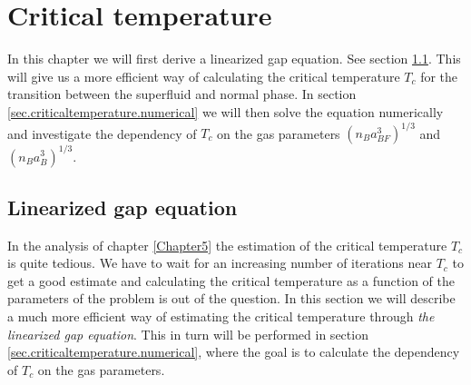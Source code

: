 
\chapter{Critical temperature} %

\label{Chapter6} %


In this chapter we will first derive a linearized gap equation. See section \ref{sec.linearizedgapequation}. This will give us a more efficient way of calculating the critical temperature $T_c$ for the transition between the superfluid and normal phase. In section \ref{sec.criticaltemperature.numerical} we will then solve the equation numerically and investigate the dependency of $T_c$ on the gas parameters $(n_Ba_{BF}^3)^{1/3}$ and $(n_Ba_B^3)^{1/3}$. 

\section{Linearized gap equation} \label{sec.linearizedgapequation}
In the analysis of chapter \ref{Chapter5} the estimation of the critical temperature $T_c$ is quite tedious. We have to wait for an increasing number of iterations near $T_c$ to get a good estimate and calculating the critical temperature as a function of the parameters of the problem is out of the question. In this section we will describe a much more efficient way of estimating the critical temperature through \textit{the linearized gap equation}. This in turn will be performed in section \ref{sec.criticaltemperature.numerical}, where the goal is to calculate the dependency of $T_c$ on the gas parameters.

